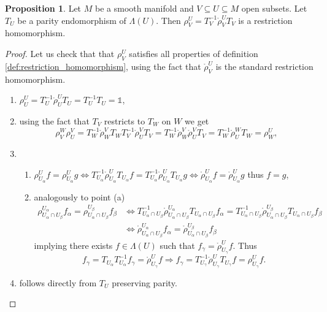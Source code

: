 \documentclass{article}
\theoremstyle{definition}
\newtheorem{proposition}{Proposition}
\begin{document}
\begin{proposition}
    Let $M$ be a smooth manifold and $V \subseteq U \subseteq M$ open subsets. Let $T_U$ be a parity endomorphism of $\Lambda(U)$. Then $\rho_V^U = T_V^{-1} \mathring{\rho}_V^U T_V$ is a restriction homomorphism.
\end{proposition}
\begin{proof}
    Let us check that that $\rho_V^U$ satisfies all properties of definition \ref{def:restriction_homomorphism}, using the fact that $\mathring{\rho}_V^U$ is the standard restriction homomorphism.
    \begin{enumerate}
        \item $\rho_U^U = T_U^{-1} \mathring{\rho}_U^U T_U = T_U^{-1} T_U = \mathds{1}$,
        \item using the fact that $T_V$ restricts to $T_W$ on $W$ we get
        \begin{equation*}
            \rho_V^W \rho_U^V = T_W^{-1} \mathring{\rho}_W^V T_W T_V^{-1} \mathring{\rho}_U^V T_V = T_W^{-1} \mathring{\rho}_W^V \mathring{\rho}_U^V T_V
            = T_W^{-1} \mathring{\rho}_U^W T_W = \rho_W^U,
        \end{equation*}
        \item
        \begin{enumerate}
            \item $\rho_{U_\alpha}^U f = \rho_{U_\alpha}^U g \Leftrightarrow 
            T_{U_\alpha}^{-1}\mathring{\rho}_{U_\alpha}^U T_{U_\alpha} f = T_{U_\alpha}^{-1}\mathring{\rho}_{U_\alpha}^U T_{U_\alpha} g \Leftrightarrow
            \mathring{\rho}_{U_\alpha}^U f = \mathring{\rho}_{U_\alpha}^U g$
            thus $f = g$,
            \item analogously to point (a)
            \begin{align*}
            \rho_{U_\alpha \cap U_\beta}^{U_\alpha} f_\alpha = \rho_{U_\alpha \cap U_\beta}^{U_\beta} f_\beta &\Longleftrightarrow
            T_{U_\alpha \cap U_\beta}^{-1} \mathring{\rho}_{U_\alpha \cap U_\beta}^{U_\alpha} T_{U_\alpha \cap U_\beta} f_\alpha = T_{U_\alpha \cap U_\beta}^{-1} \mathring{\rho}_{U_\alpha \cap U_\beta}^{U_\beta} T_{U_\alpha \cap U_\beta} f_\beta \\
            &\Longleftrightarrow \mathring{\rho}_{U_\alpha \cap U_\beta}^{U_\alpha} f_\alpha = \mathring{\rho}_{U_\alpha \cap U_\beta}^{U_\beta} f_\beta
            \end{align*}
            implying there exists $f \in \Lambda(U)$ such that $f_\gamma = \mathring{\rho}_{U_\gamma}^U f$. Thus
            \begin{equation*}
                f_\gamma = T_{U_\alpha} T_{U_\alpha}^{-1} f_\gamma = \mathring{\rho}_{U_\gamma}^U f \Longrightarrow
                f_\gamma = T_{U_\gamma}^{-1} \mathring{\rho}_{U_\gamma}^U T_{U_\gamma} f
                = \rho_{U_\gamma}^U f.
            \end{equation*} 
        \end{enumerate}
        \item follows directly from $T_U$ preserving parity.
    \end{enumerate}
\end{proof}
\end{document}
